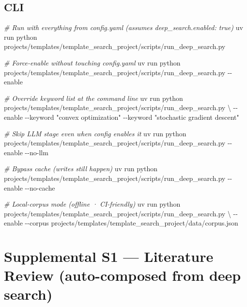 \documentclass[
]{article}
\newenvironment{Shaded}{}{}
\newcommand{\AttributeTok}[1]{\textcolor[rgb]{0.49,0.56,0.16}{#1}}
\newcommand{\CommentTok}[1]{\textcolor[rgb]{0.38,0.63,0.69}{\textit{#1}}}
\newcommand{\DataTypeTok}[1]{\textcolor[rgb]{0.56,0.13,0.00}{#1}}
\newcommand{\ExtensionTok}[1]{#1}
\newcommand{\NormalTok}[1]{#1}
\newcommand{\StringTok}[1]{\textcolor[rgb]{0.25,0.44,0.63}{#1}}
\begin{document}
\subsection{CLI}\label{cli}

\begin{Shaded}
\begin{Highlighting}[]
\CommentTok{\# Run with everything from config.yaml (assumes deep\_search.enabled: true)}
\ExtensionTok{uv}\NormalTok{ run python projects/templates/template\_search\_project/scripts/run\_deep\_search.py}

\CommentTok{\# Force{-}enable without touching config.yaml}
\ExtensionTok{uv}\NormalTok{ run python projects/templates/template\_search\_project/scripts/run\_deep\_search.py }\AttributeTok{{-}{-}enable}

\CommentTok{\# Override keyword list at the command line}
\ExtensionTok{uv}\NormalTok{ run python projects/templates/template\_search\_project/scripts/run\_deep\_search.py }\DataTypeTok{\textbackslash{}}
    \AttributeTok{{-}{-}enable} \AttributeTok{{-}{-}keyword} \StringTok{"convex optimization"} \AttributeTok{{-}{-}keyword} \StringTok{"stochastic gradient descent"}

\CommentTok{\# Skip LLM stage even when config enables it}
\ExtensionTok{uv}\NormalTok{ run python projects/templates/template\_search\_project/scripts/run\_deep\_search.py }\AttributeTok{{-}{-}enable} \AttributeTok{{-}{-}no{-}llm}

\CommentTok{\# Bypass cache (writes still happen)}
\ExtensionTok{uv}\NormalTok{ run python projects/templates/template\_search\_project/scripts/run\_deep\_search.py }\AttributeTok{{-}{-}enable} \AttributeTok{{-}{-}no{-}cache}

\CommentTok{\# Local{-}corpus mode (offline · CI{-}friendly)}
\ExtensionTok{uv}\NormalTok{ run python projects/templates/template\_search\_project/scripts/run\_deep\_search.py }\DataTypeTok{\textbackslash{}}
    \AttributeTok{{-}{-}enable} \AttributeTok{{-}{-}corpus}\NormalTok{ projects/templates/template\_search\_project/data/corpus.json}
\end{Highlighting}
\end{Shaded}

\newpage

\newpage

\section{Supplemental S1 --- Literature Review (auto-composed from deep
search)}\label{sec:supplemental_s1}
\end{document}
